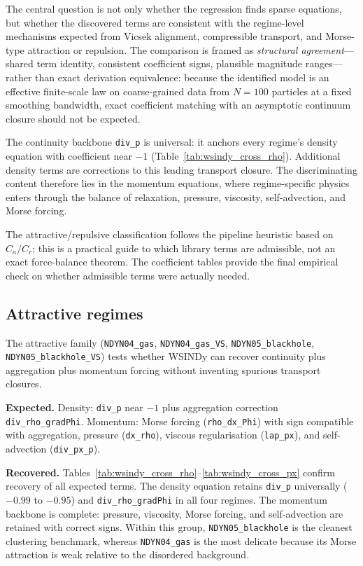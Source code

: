 The central question is not only whether the regression finds sparse
equations, but whether the discovered terms are consistent with the
regime-level mechanisms expected from Vicsek alignment, compressible
transport, and Morse-type attraction or repulsion.  The comparison is
framed as \emph{structural agreement}---shared term identity, consistent
coefficient signs, plausible magnitude ranges---rather than exact
derivation equivalence: because the identified model is an effective
finite-scale law on coarse-grained data from $N{=}100$ particles at a
fixed smoothing bandwidth, exact coefficient matching with an asymptotic
continuum closure should not be expected.

The continuity backbone \texttt{div\_p} is universal: it anchors every
regime's density equation with coefficient near $-1$
(Table~\ref{tab:wsindy_cross_rho}).  Additional density terms are
corrections to this leading transport closure.  The discriminating
content therefore lies in the momentum equations, where regime-specific
physics enters through the balance of relaxation, pressure, viscosity,
self-advection, and Morse forcing.

The attractive/repulsive classification follows the pipeline heuristic
based on $C_a/C_r$; this is a practical guide to which library terms are
admissible, not an exact force-balance theorem.  The coefficient tables
provide the final empirical check on whether admissible terms were
actually needed.

\subsection{Attractive regimes}
\label{subsec:interp_attractive}

The attractive family (\texttt{NDYN04\_gas}, \texttt{NDYN04\_gas\_VS},
\texttt{NDYN05\_blackhole}, \texttt{NDYN05\_blackhole\_VS}) tests whether
WSINDy can recover continuity plus aggregation plus momentum forcing
without inventing spurious transport closures.

\noindent\textbf{Expected.}
Density: \texttt{div\_p} near $-1$ plus aggregation correction
\texttt{div\_rho\_gradPhi}.
Momentum: Morse forcing (\texttt{rho\_dx\_Phi}) with sign compatible with
aggregation, pressure (\texttt{dx\_rho}), viscous regularisation
(\texttt{lap\_px}), and self-advection (\texttt{div\_px\_p}).

\noindent\textbf{Recovered.}
Tables~\ref{tab:wsindy_cross_rho}--\ref{tab:wsindy_cross_px} confirm
recovery of all expected terms.  The density equation retains
\texttt{div\_p} universally ($-0.99$ to $-0.95$) and
\texttt{div\_rho\_gradPhi} in all four regimes.  The momentum backbone is
complete: pressure, viscosity, Morse forcing, and self-advection are
retained with correct signs.  Within this group,
\texttt{NDYN05\_blackhole} is the cleanest clustering benchmark, whereas
\texttt{NDYN04\_gas} is the most delicate because its Morse attraction is
weak relative to the disordered background.

